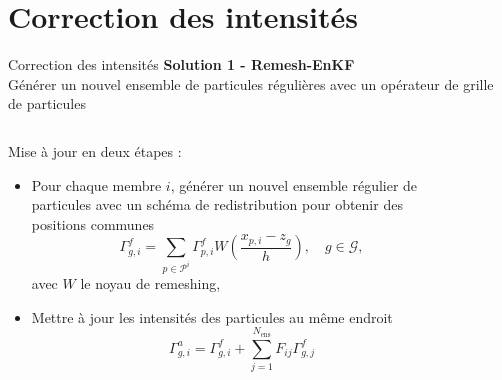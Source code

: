 \documentclass[aspectratio=169]{beamer} %
\begin{document}
\section{Correction des intensités}
\begin{frame}{Correction des intensités}
    \small
    \textbf{Solution 1 - Remesh-EnKF} \\

    Générer un nouvel ensemble de particules régulières avec un opérateur de grille de particules \\

    \begin{columns}
        \begin{column}{0.6\textwidth}
            Mise à jour en deux étapes :
            \begin{itemize}
                \item Pour chaque membre $i$, générer un nouvel ensemble régulier de particules avec un schéma de redistribution pour obtenir des positions communes~\footnotemark[1]
                      \begin{equation*}
                          \Gamma^f_{g, i} = \sum_{p \in \mathcal P^i} \Gamma^f_{p, i} W(\frac{x_{p, i} - z_g}{h}), \quad g \in \mathcal G,
                      \end{equation*}
                      avec $W$ le noyau de remeshing,
                \item Mettre à jour les intensités des particules au même endroit
                      \begin{equation*}
                          \Gamma^a_{g, i} = \Gamma^f_{g, i} + \sum_{j=1}^{N_{\text{ens}}} F_{ij} \Gamma^f_{g,j}
                      \end{equation*}
            \end{itemize}
        \end{column}
        \hspace{-0.2cm}
        \begin{column}{0.3\textwidth}
            \begin{figure}

\end{figure}
\end{column}
\end{columns}
\end{frame}
\end{document}
